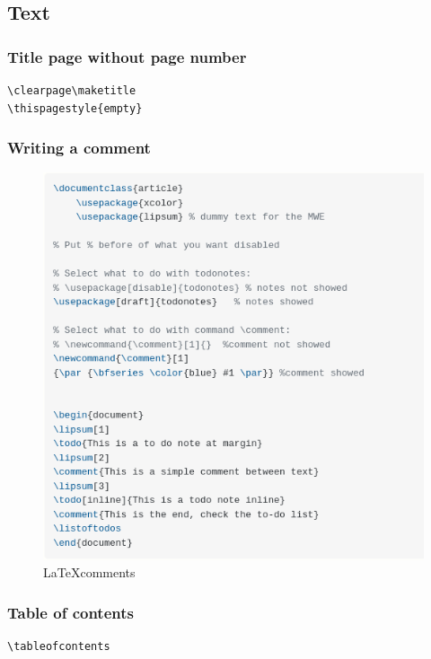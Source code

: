 \subsection{Text}

\subsubsection{Title page without page number}

\begin{verbatim}
\clearpage\maketitle
\thispagestyle{empty}
\end{verbatim}

\subsubsection{Writing a comment}
\begin{figure}[h!]
\centering
\includegraphics[scale=0.4]{images/latex_comments.png}
\caption{\LaTeX comments}
\label{fig:comments}
\end{figure}

\subsubsection{Table of contents}
\begin{verbatim}
\tableofcontents
\end{verbatim}

